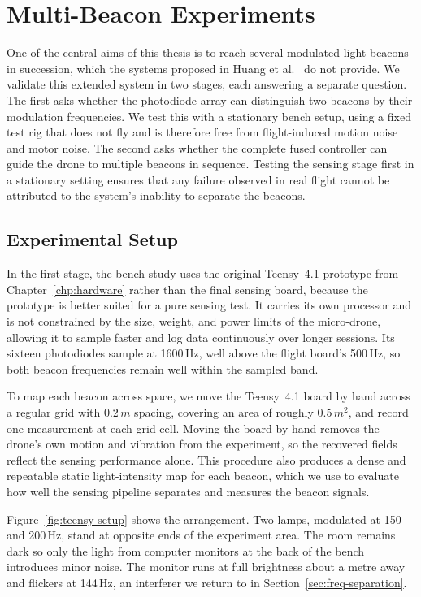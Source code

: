 \chapter{Multi-Beacon Experiments}
\label{chp:multibeacon}

One of the central aims of this thesis is to reach several modulated light beacons in succession, which the systems proposed in Huang et al.~\cite{huang2026lta} do not provide. We validate this extended system in two stages, each answering a separate question. The first asks whether the photodiode array can distinguish two beacons by their modulation frequencies. We test this with a stationary bench setup, using a fixed test rig that does not fly and is therefore free from flight-induced motion noise and motor noise. The second asks whether the complete fused controller can guide the drone to multiple beacons in sequence. Testing the sensing stage first in a stationary setting ensures that any failure observed in real flight cannot be attributed to the system's inability to separate the beacons.

\section{Experimental Setup}
\label{sec:multibeacon-setup}

In the first stage, the bench study uses the original Teensy~4.1 prototype from Chapter~\ref{chp:hardware} rather than the final sensing board, because the prototype is better suited for a pure sensing test. It carries its own processor and is not constrained by the size, weight, and power limits of the micro-drone, allowing it to sample faster and log data continuously over longer sessions. Its sixteen photodiodes sample at 1600\,Hz, well above the flight board's 500\,Hz, so both beacon frequencies remain well within the sampled band.

To map each beacon across space, we move the Teensy~4.1 board by hand across a regular grid with $0.2\,m$ spacing, covering an area of roughly $0.5\,m^2$, and record one measurement at each grid cell. Moving the board by hand removes the drone's own motion and vibration from the experiment, so the recovered fields reflect the sensing performance alone. This procedure also produces a dense and repeatable static light-intensity map for each beacon, which we use to evaluate how well the sensing pipeline separates and measures the beacon signals.


Figure~\ref{fig:teensy-setup} shows the arrangement. Two lamps, modulated at 150 and 200\,Hz, stand at opposite ends of the experiment area. The room remains dark so only the light from computer monitors at the back of the bench introduces minor noise. The monitor runs at full brightness about a metre away and flickers at 144\,Hz, an interferer we return to in Section~\ref{sec:freq-separation}.

